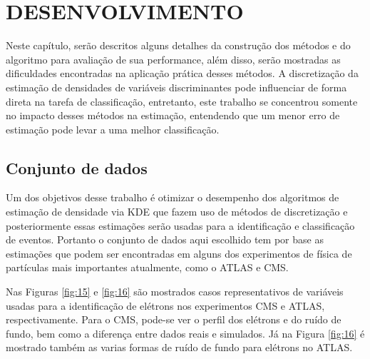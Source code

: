 \chapter{DESENVOLVIMENTO} \label{cap:desenvolvimento}
\vspace{-2cm}
Neste capítulo, serão descritos alguns detalhes da construção dos métodos e do algoritmo para avaliação de sua performance, além disso, serão mostradas as dificuldades encontradas na aplicação prática desses métodos. A discretização da estimação de densidades de variáveis discriminantes pode influenciar de forma direta na tarefa de classificação, entretanto, este trabalho se concentrou somente no impacto desses métodos na estimação, entendendo que um menor erro de estimação pode levar a uma melhor classificação.

\section{Conjunto de dados}

Um dos objetivos desse trabalho é otimizar o desempenho dos algoritmos de estimação de densidade via KDE que fazem uso de métodos de discretização e posteriormente essas estimações serão usadas para a identificação e classificação de eventos. Portanto o conjunto de dados aqui escolhido tem por base as estimações que podem ser encontradas em alguns dos experimentos de física de partículas mais importantes atualmente, como o ATLAS e CMS.

Nas Figuras \ref{fig:15} e \ref{fig:16} são mostrados casos representativos de variáveis usadas para a identificação de elétrons nos experimentos CMS e ATLAS, respectivamente. Para o CMS, pode-se ver o perfil dos elétrons e do ruído de fundo, bem como a diferença entre dados reais e simulados. Já na Figura \ref{fig:16} é mostrado também as varias formas de ruído de fundo para elétrons no ATLAS.


